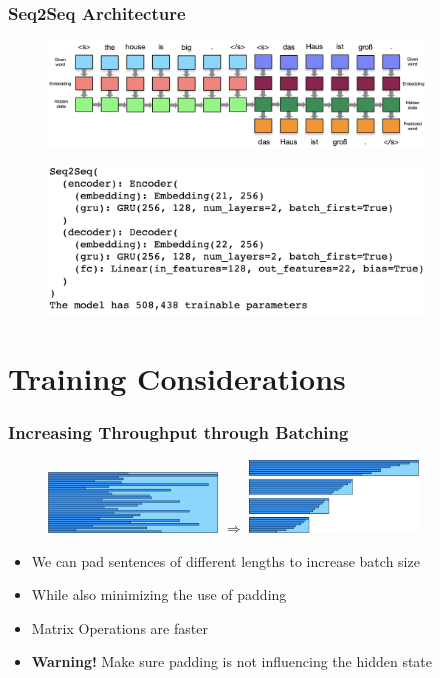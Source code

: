 \documentclass[usenames,dvipsnames]{beamer}
\begin{document}
\begin{frame}
  \frametitle{Seq2Seq Architecture}
  \begin{figure}
    \centering
    \includegraphics[width=10cm, valign=c]{assets/enc-dec}
  \end{figure}
  \begin{figure}
    \centering
    \includegraphics[width=10cm, valign=c]{assets/col-seq2seq}
  \end{figure}
\end{frame}


\section{Training Considerations}

\begin{frame}
\frametitle{Increasing Throughput through Batching}
\begin{figure}
  \centering
  \includegraphics[width=4.5cm, valign=c]{assets/full_batch}
  \quad
  $\Longrightarrow$
  \quad
  \includegraphics[width=4.5cm, valign=c]{assets/mini_batch}
\end{figure}
\begin{itemize}
  \item We can pad sentences of different lengths to increase batch size
  \item While also minimizing the use of padding
  \item Matrix Operations are faster
  \item \textbf{Warning!} Make sure padding is not influencing the hidden state
\end{itemize}
\end{frame}
\end{document}
